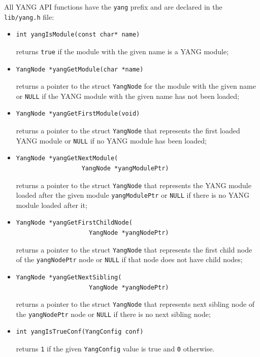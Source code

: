 \documentclass[conference]{IEEEtran}
\begin{document}
All YANG API functions have the \texttt{yang} prefix and are declared in the \texttt{lib/yang.h} file:
\begin{itemize}
\item 
\small
\begin{verbatim}
int yangIsModule(const char* name)
\end{verbatim}
\normalsize
 returns \texttt{true} if the module with the given name is a YANG module;

\item 
\small
\begin{verbatim}
YangNode *yangGetModule(char *name)
\end{verbatim}
\normalsize
returns a pointer to the struct \texttt{YangNode} for the module with the given name or \texttt{NULL} if the YANG module with the given name has not been loaded;

\item 
\small
\begin{verbatim}
YangNode *yangGetFirstModule(void)
\end{verbatim}
\normalsize
returns a pointer to the struct \texttt{YangNode} that represents the first loaded YANG module or \texttt{NULL} if no YANG module has been loaded;

\item 
\small
\begin{verbatim}
YangNode *yangGetNextModule(
                  YangNode *yangModulePtr)
\end{verbatim}
\normalsize
returns a pointer to the struct \texttt{YangNode} that represents the YANG module loaded after the given module \texttt{yangModulePtr} or \texttt{NULL} if there is no YANG module loaded after it;

\item 
\small
\begin{verbatim}
YangNode *yangGetFirstChildNode(
                    YangNode *yangNodePtr)
\end{verbatim}
\normalsize
returns a pointer to the struct \texttt{YangNode} that represents the first child node of the \texttt{yangNodePtr} node or \texttt{NULL} 
if that node does not have child nodes;

\item 
\small
\begin{verbatim}
YangNode *yangGetNextSibling(
                    YangNode *yangNodePtr)
\end{verbatim}
\normalsize
returns a pointer to the struct \texttt{YangNode} that represents next sibling node of the \texttt{yangNodePtr} node or \texttt{NULL}
if there is no next sibling node;

\item 
\small
\begin{verbatim}
int yangIsTrueConf(YangConfig conf)
\end{verbatim}
\normalsize
returns \texttt{1} if the given \texttt{YangConfig} value is true and \texttt{0} otherwise.
\end{itemize}
\end{document}
